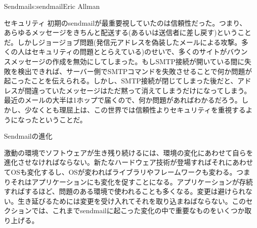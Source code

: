 \begin{aosachapter}{Sendmail}{s:sendmail}{Eric Allman}
\begin{aosasect1}{セキュリティ}
初期のsendmailが最重要視していたのは信頼性だった。つまり、あらゆるメッセージをきちんと配送する(あるいは送信者に差し戻す)ということだ。しかしジョージョブ問題(発信元アドレスを偽装したメールによる攻撃。多くの人はセキュリティの問題ととらえている)のせいで、多くのサイトがバウンスメッセージの作成を無効にしてしまった。もしSMTP接続が開いている間に失敗を検出できれば、サーバー側でSMTPコマンドを失敗させることで何か問題が起こったことを伝えられる。しかし、SMTP接続が閉じてしまった後だと、アドレスが間違っていたメッセージはただ黙って消えてしまうだけになってしまう。最近のメールの大半は1ホップで届くので、何か問題があればわかるだろう。しかし、少なくとも理屈上は、この世界では信頼性よりセキュリティを重視するようになったということだ。

\end{aosasect1}

\begin{aosasect1}{Sendmailの進化}
\label{sec.sendmail.evo}

激動の環境でソフトウェアが生き残り続けるには、環境の変化にあわせて自らを進化させなければならない。新たなハードウェア技術が登場すればそれにあわせてOSも変化するし、OSが変わればライブラリやフレームワークも変わる。つまりそれはアプリケーションにも変化を促すことになる。アプリケーションが存続すればするほど、問題のある環境で使われることも多くなる。変更は避けられない。生き延びるためには変更を受け入れてそれを取り込まねばならない。このセクションでは、これまでsendmailに起こった変化の中で重要なものをいくつか取り上げる。


\end{aosasect1}
\end{aosachapter}
